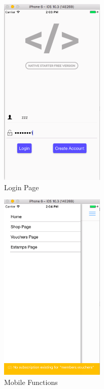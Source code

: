 \documentclass[12pt]{scrartcl}
\begin{document}
\begin{figure}[htbp]
\caption{\label{fig:org606d639}
Login Page}
\centering
\includegraphics[width=5cm]{./img/mobile.png}
\end{figure}

\begin{figure}[htbp]
\caption{\label{fig:orgedc7f17}
Mobile Functions}
\centering
\includegraphics[width=5cm]{./img/mobilefunction.png}
\end{figure}
\end{document}

